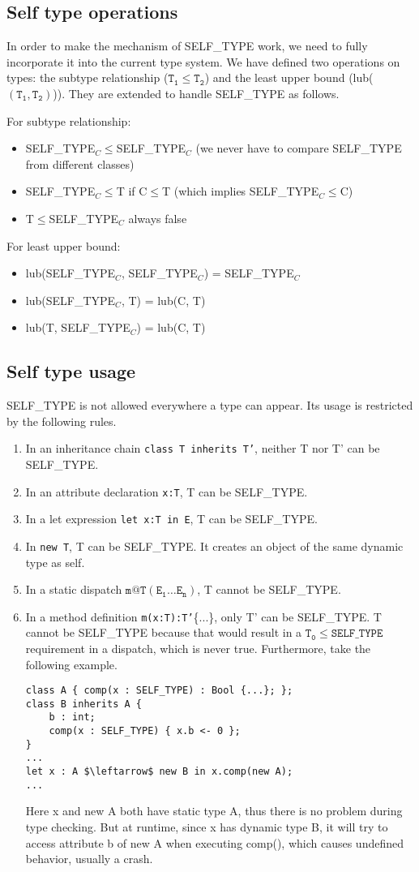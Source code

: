 \subsection{Self type operations}
In order to make the mechanism of SELF\_TYPE work, we need to fully incorporate it into the current type system. We have defined two operations on types: the subtype relationship ($\mathtt{T_1\leq T_2}$) and the least upper bound (lub($\mathtt{(T_1,T_2)}$)). They are extended to handle SELF\_TYPE as follows.

For subtype relationship: 
\begin{itemize}
\item SELF\_TYPE$_C\leq$SELF\_TYPE$_C$ (we never have to compare SELF\_TYPE from different classes)
\item SELF\_TYPE$_C\leq$T if C$\leq$T (which implies SELF\_TYPE$_C\leq$C)
\item T$\leq$SELF\_TYPE$_C$ always false
\end{itemize} 

For least upper bound:
\begin{itemize}
\item lub(SELF\_TYPE$_C$, SELF\_TYPE$_C$) = SELF\_TYPE$_C$
\item lub(SELF\_TYPE$_C$, T) = lub(C, T)
\item lub(T, SELF\_TYPE$_C$) = lub(C, T)
\end{itemize}
\subsection{Self type usage}
SELF\_TYPE is not allowed everywhere a type can appear. Its usage is restricted by the following rules.
\begin{enumerate}
\item In an inheritance chain \texttt{class T inherits T'}, neither T nor T' can be SELF\_TYPE.
\item In an attribute declaration \texttt{x:T}, T can be SELF\_TYPE.
\item In a let expression \texttt{let x:T in E}, T can be SELF\_TYPE.
\item In \texttt{new T}, T can be SELF\_TYPE. It creates an object of the same dynamic type as self.
\item In a static dispatch $\mathtt{m@T(E_1\dots E_n)}$, T cannot be SELF\_TYPE.
\item In a method definition \texttt{m(x:T):T'}\{...\}, only T' can be SELF\_TYPE. T cannot be SELF\_TYPE because that would result in a $\mathtt{T_0\leq SELF\_TYPE}$ requirement in a dispatch, which is never true. Furthermore, take the following example.
\begin{lstlisting}[mathescape = true]
class A { comp(x : SELF_TYPE) : Bool {...}; };
class B inherits A {
	b : int;
	comp(x : SELF_TYPE) { x.b <- 0 };
}
...
let x : A $\leftarrow$ new B in x.comp(new A);
...
\end{lstlisting}
Here x and new A both have static type A, thus there is no problem during type checking. But at runtime, since x has dynamic type B, it will try to access attribute b of new A when executing comp(), which causes undefined behavior, usually a crash. 
\end{enumerate}
